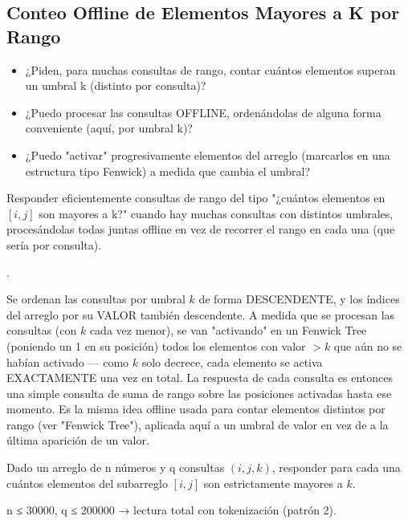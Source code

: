 \subsection{Conteo Offline de Elementos Mayores a K por Rango}


\begin{itemize}
\item ¿Piden, para muchas consultas de rango, contar cuántos elementos superan un umbral k (distinto por consulta)?
\item ¿Puedo procesar las consultas OFFLINE, ordenándolas de alguna forma conveniente (aquí, por umbral k)?
\item ¿Puedo "activar" progresivamente elementos del arreglo (marcarlos en una estructura tipo Fenwick) a medida que cambia el umbral?
\end{itemize}

 Responder eficientemente consultas de rango del tipo "¿cuántos elementos en $[i,j]$ son mayores a k?" cuando hay muchas consultas con distintos umbrales, procesándolas todas juntas offline en vez de recorrer el rango en cada una (que sería  por consulta).

 .

 Se ordenan las consultas por umbral $k$ de forma DESCENDENTE, y los índices del arreglo por su VALOR también descendente. A medida que se procesan las consultas (con $k$ cada vez menor), se van "activando" en un Fenwick Tree (poniendo un 1 en su posición) todos los elementos con valor $> k$ que aún no se habían activado — como $k$ solo decrece, cada elemento se activa EXACTAMENTE una vez en total. La respuesta de cada consulta es entonces una simple consulta de suma de rango sobre las posiciones activadas hasta ese momento. Es la misma idea offline usada para contar elementos distintos por rango (ver "Fenwick Tree"), aplicada aquí a un umbral de valor en vez de a la última aparición de un valor.


Dado un arreglo de n números y q consultas $(i,j,k)$, responder para cada una cuántos elementos del subarreglo $[i,j]$ son estrictamente mayores a $k$.

 n ≤ 30000, q ≤ 200000 → lectura total con tokenización (patrón 2).


